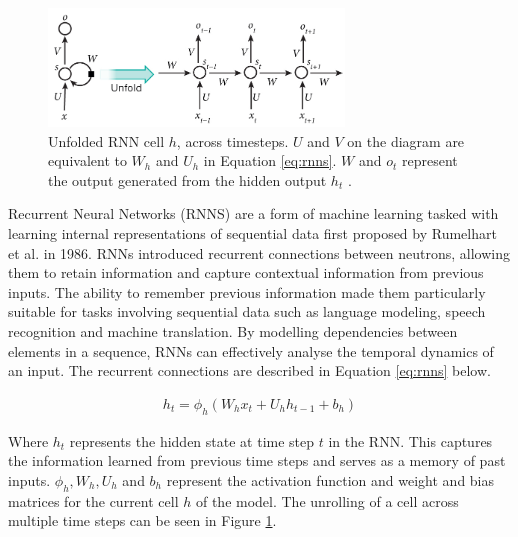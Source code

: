 \begin{figure}[H]
    \centering
    \includegraphics[width=0.7\textwidth]{graphs/rnn.png}
    \caption{Unfolded RNN cell $h$, across timesteps. $U$ and $V$ on the diagram are equivalent to $W_{h}$ and $U_{h}$ in Equation \ref{eq:rnns}. $W$ and $o_{t}$ represent the output generated from the hidden output $h_{t}$ \cite{RNN_diagram}.}
    \label{fig:rnn}
\end{figure}

Recurrent Neural Networks (RNNS) are a form of machine learning tasked with learning internal representations of sequential data first proposed by Rumelhart et al. \cite{rnns} in 1986. RNNs introduced recurrent connections between neutrons, allowing them to retain information and capture contextual information from previous inputs. The ability to remember previous information made them particularly suitable for tasks involving sequential data such as language modeling, speech recognition and machine translation. By modelling dependencies between elements in a sequence, RNNs can effectively analyse the temporal dynamics of an input. The recurrent connections are described in Equation \ref{eq:rnns} below.

\begin{equation}
    \begin{gathered}
        h_{t} = \phi_{h}\left( W_{h}x_{t} + U_{h}h_{t-1} + b_{h} \right)
    \end{gathered}
    \label{eq:rnns}
\end{equation}

Where $h_{t}$ represents the hidden state at time step $t$ in the RNN. This captures the information learned from previous time steps and serves as a memory of past inputs. $\phi_{h}, W_{h}, U_{h}$ and $b_{h}$ represent the activation function and weight and bias matrices for the current cell $h$ of the model. The unrolling of a cell across multiple time steps can be seen in Figure \ref{fig:rnn}.

